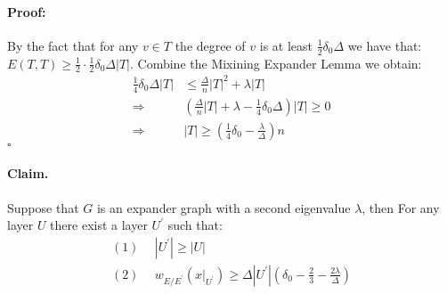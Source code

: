 \documentclass{article}
\begin{document}
\begin{multicols*}{2}
  \paragraph{Proof:} By the fact that for any $v \in T$ the degree of $v$ is at least $\frac{1}{2}\delta_{0}\Delta$ we have that: $E\left( T,T \right) \ge \frac{1}{2}\cdot \frac{1}{2}\delta_{0}\Delta |T|$. Combine the Mixining Expander Lemma we obtain:
  \begin{equation*}
    \begin{split}
      \frac{1}{4}\delta_{0}\Delta |T| & \le \frac{\Delta}{n}|T|^2  + \lambda|T| \\ 
      \Rightarrow & \left( \frac{\Delta}{n}|T| + \lambda -  \frac{1}{4}\delta_{0}\Delta \right)|T| \ge 0 \\ 
      \Rightarrow & |T| \ge \left( \frac{1}{4}\delta_{0} - \frac{\lambda}{\Delta} \right)n 
    \end{split}
  \end{equation*}
  $\square$

  \paragraph{Claim.} Suppose that $G$ is an expander graph with a second eigenvalue $\lambda$, then For any layer $U$ there exist a layer $U^{\prime}$ such that:
  \begin{equation*}
    \begin{split}
      (1) & \ \ |U^{\prime}| \ge |U| \\
      (2) & \ \ w_{E/E^{\prime}}\left( x|_{U^{\prime}} \right)  \ge\Delta|U^{\prime}|\left( \delta_{0}-\frac{2}{3}-\frac{2\lambda}{\Delta} \right)
    \end{split}
  \end{equation*}

\end{multicols*}
\end{document}
